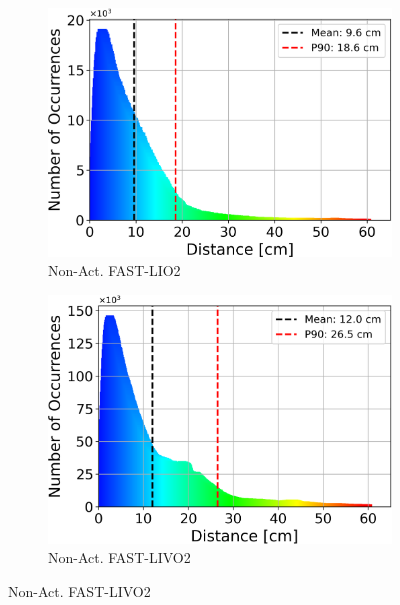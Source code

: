 \documentclass[english, bachelor, utf8]{base/thesis_telematics}
\begin{document}
\begin{figure}
\begin{subfigure}{0.45\textwidth}
    \centering
    \includegraphics[width=\textwidth]{pics/histogram_results/histogram_cond_non_actuated_lio.png}
    \caption{Non-Act. FAST-LIO2}
    \label{fig:hist_non_lio}
\end{subfigure}
\begin{subfigure}{0.45\textwidth}
    \centering
    \includegraphics[width=\textwidth]{pics/histogram_results/histogram_cond_non_actuated_livo.png}
    \caption{Non-Act. FAST-LIVO2}
    \label{fig:hist_non_livo}
\end{subfigure}


\end{figure}
\end{document}
